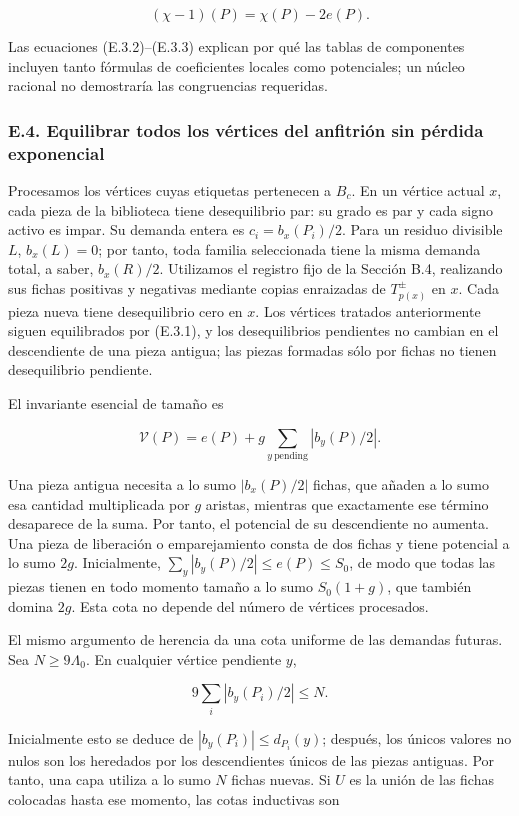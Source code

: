 \documentclass[spanish,11pt,a4paper]{article}
\begin{document}
\[(\chi-1)(P)=\chi(P)-2e(P).
\tag{E.3.3}\]

Las ecuaciones (E.3.2)--(E.3.3) explican por qué las tablas de componentes incluyen tanto fórmulas de coeficientes locales como potenciales; un núcleo racional no demostraría las congruencias requeridas.

\subsubsection{E.4. Equilibrar todos los vértices del anfitrión sin pérdida exponencial}\label{e.4.-equilibrar-todos-los-vuxe9rtices-del-anfitriuxf3n-sin-puxe9rdida-exponencial}

Procesamos los vértices cuyas etiquetas pertenecen a \(B_c\). En un vértice actual \(x\), cada pieza de la biblioteca tiene desequilibrio par: su grado es par y cada signo activo es impar. Su demanda entera es \(c_i=b_x(P_i)/2\). Para un residuo divisible \(L\), \(b_x(L)=0\); por tanto, toda familia seleccionada tiene la misma demanda total, a saber, \(b_x(R)/2\). Utilizamos el registro fijo de la Sección B.4, realizando sus fichas positivas y negativas mediante copias enraizadas de \(T_{p(x)}^\pm\) en \(x\). Cada pieza nueva tiene desequilibrio cero en \(x\). Los vértices tratados anteriormente siguen equilibrados por (E.3.1), y los desequilibrios pendientes no cambian en el descendiente de una pieza antigua; las piezas formadas sólo por fichas no tienen desequilibrio pendiente.

El invariante esencial de tamaño es

\[\mathcal V(P)=e(P)+g\sum_{y\ \mathrm{pending}}|b_y(P)/2|.
\tag{E.4.1}\]

Una pieza antigua necesita a lo sumo \(|b_x(P)/2|\) fichas, que añaden a lo sumo esa cantidad multiplicada por \(g\) aristas, mientras que exactamente ese término desaparece de la suma. Por tanto, el potencial de su descendiente no aumenta. Una pieza de liberación o emparejamiento consta de dos fichas y tiene potencial a lo sumo \(2g\). Inicialmente, \(\sum_y|b_y(P)/2|\le e(P)\le S_0\), de modo que todas las piezas tienen en todo momento tamaño a lo sumo \(S_0(1+g)\), que también domina \(2g\). Esta cota no depende del número de vértices procesados.

El mismo argumento de herencia da una cota uniforme de las demandas futuras. Sea \(N\ge9\Lambda_0\). En cualquier vértice pendiente \(y\),

\[9\sum_i|b_y(P_i)/2|\le N.
\tag{E.4.2}\]

Inicialmente esto se deduce de \(|b_y(P_i)|\le d_{P_i}(y)\); después, los únicos valores no nulos son los heredados por los descendientes únicos de las piezas antiguas. Por tanto, una capa utiliza a lo sumo \(N\) fichas nuevas. Si \(U\) es la unión de las fichas colocadas hasta ese momento, las cotas inductivas son
\end{document}
